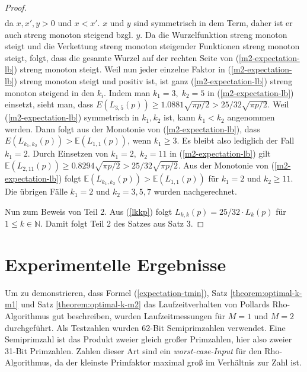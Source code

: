 \documentclass[a4paper, 10pt, ngerman]{article}
\newcommand{\E}{\mathbb{E}}
\newcommand{\N}{\mathbb{N}}
\begin{document}
\begin{proof}
\begin{align*}
        \end{align*}
        da $x, x', y > 0$ und $x < x'$. $x$ und $y$ sind symmetrisch in dem Term, daher ist er auch streng monoton steigend bzgl. $y$. Da die Wurzelfunktion streng monoton steigt und die Verkettung streng monoton steigender Funktionen streng monoton steigt, folgt, dass die gesamte Wurzel auf der rechten Seite von (\ref{m2-expectation-lb}) streng monoton steigt. Weil nun jeder einzelne Faktor in (\ref{m2-expectation-lb}) streng monoton steigt und positiv ist, ist ganz (\ref{m2-expectation-lb}) streng monoton steigend in den $k_i$. Indem man $k_1 = 3,\; k_2 = 5$ in (\ref{m2-expectation-lb}) einsetzt, sieht man, dass $E(L_{3, 5}(p)) \ge 1.0881 \sqrt{\pi p /2}  > 25 / 32 \sqrt{\pi p / 2}$. Weil (\ref{m2-expectation-lb}) symmetrisch in $k_1, k_2$ ist, kann $k_1 < k_2$ angenommen werden. Dann folgt aus der Monotonie von (\ref{m2-expectation-lb}), dass $E(L_{k_1, k_2}(p)) > \E(L_{1, 1}(p))$, wenn $k_1 \ge 3$. Es bleibt also lediglich der Fall $k_1 = 2$. Durch Einsetzen von $k_1 = 2, \; k_2 = 11$ in (\ref{m2-expectation-lb}) gilt $\E(L_{2, 11}(p)) \ge 0.8294 \sqrt{\pi p / 2} > 25 / 32 \sqrt{\pi p / 2}$. Aus der Monotonie von (\ref{m2-expectation-lb}) folgt $\E(L_{k_1, k_2}(p)) > \E(L_{1, 1}(p))$ für $k_1 = 2$ und $k_2 \ge 11$. Die übrigen Fälle $k_1 = 2$ und $k_2 = 3, 5, 7$ wurden nachgerechnet.

        Nun zum Beweis von Teil 2. Aus (\ref{lkkp}) folgt $L_{k, k}(p) = 25 / 32 \cdot L_{k}(p)$ für $1 \le k \in \N$. Damit folgt Teil 2 des Satzes aus Satz 3.
    \end{proof}

    \section{Experimentelle Ergebnisse}

    Um zu demonstrieren, dass Formel (\ref{expectation-tmin}), Satz \ref{theorem:optimal-k-m1} und Satz \ref{theorem:optimal-k-m2} das Laufzeitverhalten von Pollards Rho-Algorithmus gut beschreiben, wurden Laufzeitmessungen für $M = 1$ und $M = 2$ durchgeführt. Als Testzahlen wurden 62-Bit Semiprimzahlen verwendet. Eine Semiprimzahl ist das Produkt zweier gleich großer Primzahlen, hier also zweier 31-Bit Primzahlen. Zahlen dieser Art sind ein \emph{worst-case-Input} für den Rho-Algorithmus, da der kleinste Primfaktor maximal groß im Verhältnis zur Zahl ist.
\end{document}
